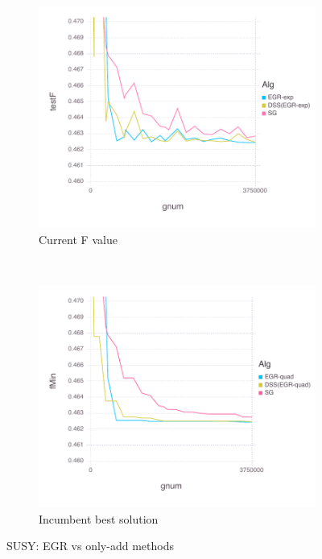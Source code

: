 \documentclass[11pt]{article}
\begin{document}
   \begin{figure}[H]
       \centering
       \begin{subfigure}[b]{0.45\textwidth}
           \includegraphics[width=\textwidth]{Figures/SUSYBLtrueFfFinal-dss.pdf}
           \caption{Current F value}
       \end{subfigure}
       ~ %
         \begin{subfigure}[b]{0.45\textwidth}
             \includegraphics[width=\textwidth]{Figures/SUSYBLtrueFminfFinal-dss.pdf}
             \caption{Incumbent best solution}
         \end{subfigure}
       \caption{SUSY: EGR vs only-add methods}\label{fig:SUSYoa}
   \end{figure}
   
\end{document}
